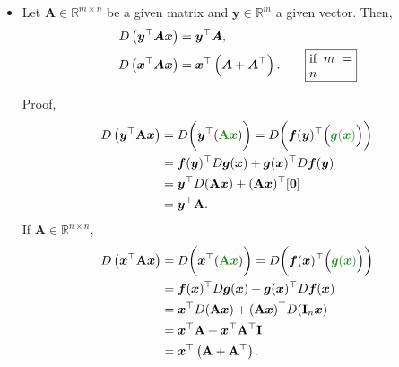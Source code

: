 \documentclass[12pt,thmsa]{article}
\begin{document}
\begin{itemize}
	\item Let \(\boldsymbol{A} \in \mathbb{R}^{m \times n}\) be a given matrix and \(\boldsymbol{y} \in \mathbb{R}^{m}\) a given vector. Then,
	\begin{align*}
		D\left(\boldsymbol{y}^{\top} \boldsymbol{A} \boldsymbol{x}\right) &=
		\boldsymbol{y}^{\top} \boldsymbol{A}, \\
		D\left(\boldsymbol{x}^{\top} \boldsymbol{A} \boldsymbol{x}\right) &=
		\boldsymbol{x}^{\top}\left(\boldsymbol{A}+\boldsymbol{A}^{\top}\right).  \qquad
		\fbox{\parbox{0.1\textwidth}{ if \(m=n\) }}
	\end{align*}

	
	Proof,
	\[\begin{aligned}    
		D\left(\boldsymbol{y}^{\top} \mathbf{A} \boldsymbol{x}\right) 
		&=D \bigg ( \boldsymbol{y}^{\top}( {\color{forestgreen}{\mathbf{A} \boldsymbol{x}}} ) \bigg )
		=D \bigg ( \boldsymbol{f}(\boldsymbol{y})^{\top} \Big( {\color{forestgreen}{\boldsymbol{g}(\boldsymbol{x})}} \Big) \bigg ) \\    
		&=\boldsymbol{f}(\boldsymbol{y})^{\top} D \boldsymbol{g} (\boldsymbol{x})
		+\boldsymbol{g}(\boldsymbol{x})^{\top} D \boldsymbol{f}(\boldsymbol{y}) \\    
		&=\boldsymbol{y}^{\top} D(\mathbf{A} \boldsymbol{x})+(\mathbf{A} \boldsymbol{x})^{\top}[\mathbf{0}] \\
		&=\boldsymbol{y}^{\top} \mathbf{A}.
	\end{aligned}\]
	If \(\boldsymbol{A} \in \mathbb{R}^{n \times n}\),
	\[ \begin{aligned}    
		D\left(\boldsymbol{x}^{\top} \mathbf{A} \boldsymbol{x}\right)    
		&=D \bigg( \boldsymbol{x}^{\top}( {\color{forestgreen}{\mathbf{A} \boldsymbol{x}}} ) \bigg)
		=D\bigg(\boldsymbol{f}(\boldsymbol{x})^{\top} \Big( {\color{forestgreen}{\boldsymbol{g}(\boldsymbol{x})}} \Big ) \bigg) \\     
		&=\boldsymbol{f}(\boldsymbol{x})^{\top} D \boldsymbol{g} (\boldsymbol{x})+\boldsymbol{g}(\boldsymbol{x})^{\top} D \boldsymbol{f}(\boldsymbol{x}) \\    
		&=\boldsymbol{x}^{\top} D(\mathbf{A} \boldsymbol{x})+(\mathbf{A} \boldsymbol{x})^{\top} D(\mathbf{I}_{n} \boldsymbol{x}) \\    
		&=\boldsymbol{x}^{\top} \mathbf{A}+\boldsymbol{x}^{\top} \mathbf{A}^{\top} \mathbf{I}  \\
		&=\boldsymbol{x}^{\top} \left(\mathbf{A}+\mathbf{A}^{\top}\right).
	\end{aligned} \]


\end{itemize}
\end{document}
